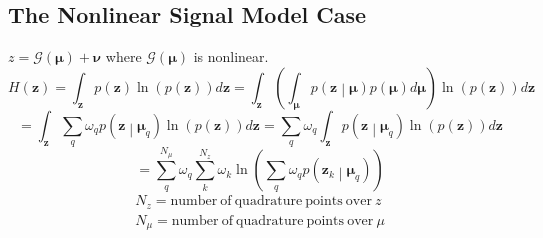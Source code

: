 \documentclass{article}         %
\theoremstyle{definition}
\theoremstyle{remark}
\newcommand{\eq}[1]{\begin{equation} #1 \end{equation}}
\newcommand{\gt}[1]{\begin{gather} #1 \end{gather}}
\newcommand{\zbf}{\mathbf{z}}
\newcommand{\mubf}{\boldsymbol{\mu}}
\newcommand{\nubf}{\boldsymbol{\nu}}
\newcommand{\zcondbf}{\mathbf{z}\middle|\boldsymbol{\mu}}
\newcommand{\Gscript}{\mathcal{G}}
\newcommand{\paren}[1]{\left(#1\right)}
\begin{document}
\subsection{The Nonlinear Signal Model Case}
$z = \Gscript\paren{\mubf}+\nubf$ where $\Gscript\paren{\mubf}$ is nonlinear.
\eq{H\paren{\zbf} = \int_\zbf p\paren{\zbf}\ln\paren{p\paren{\zbf}}d\zbf = \int_\zbf\paren{\int_{\mubf}p\paren{\zcondbf}p\paren{\mubf}d\mubf}\ln\paren{p\paren{\zbf}}d\zbf}
\eq{= \int_\zbf\sum\limits_q\omega_qp\paren{\zcondbf_q}\ln\paren{p\paren{\zbf}}d\zbf = \sum\limits_q\omega_q\int_\zbf p\paren{\zcondbf_q}\ln\paren{p\paren{\zbf}}d\zbf}
\eq{= \sum\limits_q^{N_\mu}\omega_q\sum\limits_k^{N_z}\omega_k\ln\paren{\sum\limits_q\omega_qp\paren{\zbf_k\middle|\mubf_q}}}
\gt{N_z = \mathrm{number\ of\ quadrature\ points\ over\ }z\\
N_\mu = \mathrm{number\ of\ quadrature\ points\ over\ }\mu}
\end{document}

